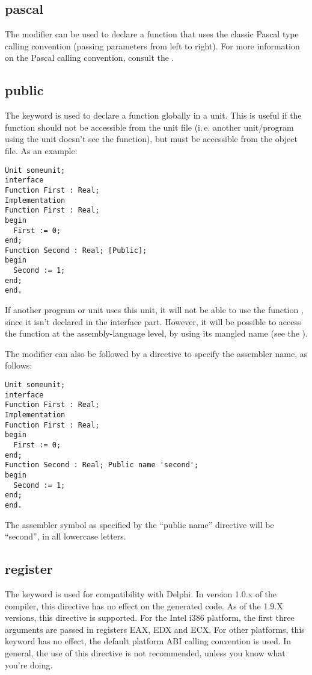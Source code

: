 %
%
\subsection{pascal}
\label{se:pascal}
The  modifier can be used to declare a function that uses the
classic Pascal type calling convention (passing parameters from left to right).
For more information on the Pascal calling convention, consult the \progref.

\subsection{public}
\label{se:public}
The  keyword is used to declare a function globally in a unit.
This is useful if the function should not be accessible from the unit
file (i.\,e. another unit/program using the unit doesn't see the function),
but must be accessible from the object file. As an example:
\begin{verbatim}
Unit someunit;
interface
Function First : Real;
Implementation
Function First : Real;
begin
  First := 0;
end;
Function Second : Real; [Public];
begin
  Second := 1;
end;
end.
\end{verbatim}
If another program or unit uses this unit, it will not be able to use the
function , since it isn't declared in the interface part.
However, it will be possible to access the function  at the
assembly-language level, by using its mangled name (see the \progref).

The  modifier can also be followed by a  directive to
specify the assembler name, as follows:
\begin{verbatim}
Unit someunit;
interface
Function First : Real;
Implementation
Function First : Real;
begin
  First := 0;
end;
Function Second : Real; Public name 'second';
begin
  Second := 1;
end;
end.
\end{verbatim}
The assembler symbol as specified by the ``public name'' directive will
be ``second'', in all lowercase letters.

\subsection{register}
\label{se:register}
The  keyword is used for compatibility with Delphi.
In version 1.0.x of the compiler, this directive has no effect on the
generated code. As of the 1.9.X versions, this directive is supported.
For the Intel i386 platform, the first three arguments are passed in registers EAX, EDX and ECX.
For other platforms, this keyword has no effect, the default platform ABI calling
convention is used. In general, the use of this directive is not
recommended, unless you know what you're doing.

